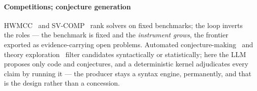 \paragraph{Competitions; conjecture generation}
HWMCC~\citep{niemetz2018btor2} and SV-COMP~\citep{beyer2021svcomp}
rank solvers on fixed benchmarks; the loop inverts the roles --- the
benchmark is fixed and the \emph{instrument grows}, the frontier
exported as evidence-carrying open problems. Automated
conjecture-making~\citep{fajtlowicz1988graffiti,colton2002hr} and
theory exploration~\citep{claessen2010quickspec} filter candidates
syntactically or statistically; here the LLM proposes only code and
conjectures, and a deterministic kernel adjudicates every claim by
running it --- the producer stays a syntax engine, permanently, and
that is the design rather than a concession.
